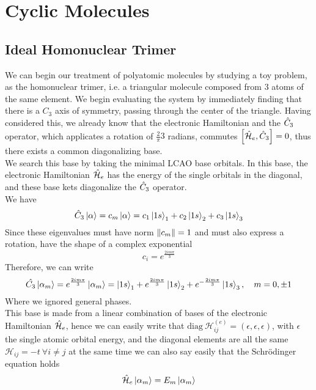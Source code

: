 \documentclass[../qm.tex]{subfiles}
\begin{document}
	\section{Cyclic Molecules}
	\subsection{Ideal Homonuclear Trimer}
	We can begin our treatment of polyatomic molecules by studying a toy problem, as the homonuclear trimer, i.e. a triangular molecule composed from 3 atoms of the same element. We begin evaluating the system by immediately finding that there is a $C_3$ axis of symmetry, passing through the center of the triangle. Having considered this, we already know that the electronic Hamiltonian and the $\hat{C}_3$ operator, which applicates a rotation of $\frac{2}{\pi}{3}$ radians, commutes $\comm{\opr{\ham}_e}{\opr{C}_3}=0$, thus there exists a common diagonalizing base.\\
	We search this base by taking the minimal LCAO base orbitals. In this base, the electronic Hamiltonian $\hat{\mathcal{H}}_e$ has the energy of the single orbitals in the diagonal, and these base kets diagonalize the $\hat{C}_3$ operator.\\
	We have
	\begin{equation*}
		\hat{C}_3\ket{\alpha}=c_m\ket{\alpha}=c_1\ket{1s}_1+c_2\ket{1s}_2+c_3\ket{1s}_3
	\end{equation*}
	Since these eigenvalues must have norm $\norm{c_m}=1$ and must also express a rotation, have the shape of a complex exponential
	\begin{equation*}
		c_i=e^{\frac{2im\pi}{3}}
	\end{equation*}
	Therefore, we can write
	\begin{equation*}
		\hat{C_3}\ket{\alpha_m}=e^{\frac{2im\pi}{3}}\ket{\alpha_m}=\ket{1s}_1+e^{\frac{2im\pi}{3}}\ket{1s}_2+e^{-\frac{2im\pi}{3}}\ket{1s}_3,\quad m=0,\pm1
	\end{equation*}
	Where we ignored general phases.\\
	This base is made from a linear combination of bases of the electronic Hamiltonian $\hat{\mathcal{H}}_e$, hence we can easily write that $\mathrm{diag}\ \mathcal{H}_{ij}^{(e)}=(\epsilon,\epsilon,\epsilon)$, with $\epsilon$ the single atomic orbital energy, and the diagonal elements are all the same $\mathcal{H}_{ij}=-t\ \forall i\ne j$ at the same time we can also say easily that the Schrödinger equation holds
	\begin{equation*}
		\hat{\mathcal{H}}_e\ket{\alpha_m}=E_m\ket{\alpha_m}
	\end{equation*}
\end{document}
